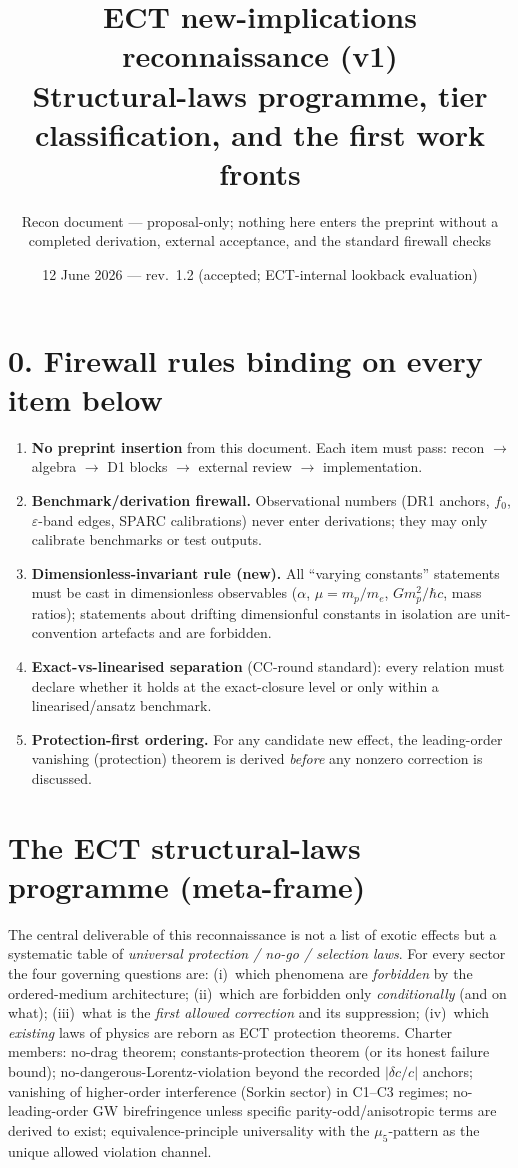 \documentclass[11pt,a4paper]{article}
\title{\textbf{ECT new-implications reconnaissance (v1)}\\
\large Structural-laws programme, tier classification, and the first work fronts}
\author{Recon document --- proposal-only; nothing here enters the preprint without a
completed derivation, external acceptance, and the standard firewall checks}
\date{12 June 2026 --- rev.~1.2 (accepted; ECT-internal lookback evaluation)}
\begin{document}
\maketitle

\section*{0. Firewall rules binding on every item below}
\begin{enumerate}[leftmargin=1.6em,itemsep=1pt]
\item \textbf{No preprint insertion} from this document. Each item must pass: recon
$\to$ algebra $\to$ D1 blocks $\to$ external review $\to$ implementation.
\item \textbf{Benchmark/derivation firewall.} Observational numbers (DR1 anchors,
$f_0$, $\varepsilon$-band edges, SPARC calibrations) never enter derivations; they may
only calibrate benchmarks or test outputs.
\item \textbf{Dimensionless-invariant rule (new).} All ``varying constants'' statements
must be cast in dimensionless observables ($\alpha$, $\mu=m_p/m_e$, $G m_p^2/\hbar c$,
mass ratios); statements about drifting dimensionful constants in isolation are
unit-convention artefacts and are forbidden.
\item \textbf{Exact-vs-linearised separation} (CC-round standard): every relation must
declare whether it holds at the exact-closure level or only within a linearised/ansatz
benchmark.
\item \textbf{Protection-first ordering.} For any candidate new effect, the
leading-order vanishing (protection) theorem is derived \emph{before} any nonzero
correction is discussed.
\end{enumerate}

\section{The ECT structural-laws programme (meta-frame)}
The central deliverable of this reconnaissance is not a list of exotic effects but a
systematic table of \emph{universal protection / no-go / selection laws}. For every
sector the four governing questions are:
(i)~which phenomena are \emph{forbidden} by the ordered-medium architecture;
(ii)~which are forbidden only \emph{conditionally} (and on what);
(iii)~what is the \emph{first allowed correction} and its suppression;
(iv)~which \emph{existing} laws of physics are reborn as ECT protection theorems.
Charter members:
no-drag theorem; constants-protection theorem (or its honest failure bound);
no-dangerous-Lorentz-violation beyond the recorded $|\delta c/c|$ anchors;
vanishing of higher-order interference (Sorkin sector) in C1--C3 regimes;
no-leading-order GW birefringence unless specific parity-odd/anisotropic terms are
derived to exist; equivalence-principle universality with the $\mu_5$-pattern as the
unique allowed violation channel.
\end{document}
